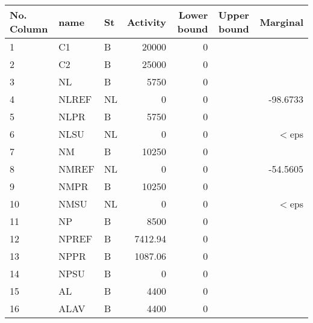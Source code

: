 \documentclass[a4paper,10pt]{article}
\begin{document}
\begin{center}
  \begin{tabular}{| l  l  l  r  r  c  r |}
    \hline
    No. Column &   name &    St &     Activity &       Lower bound &     Upper bound &      Marginal 	\\ \hline
    \hline
      1 &   C1 &             B &            20000 &               0 &                &		\\
      2 &   C2 &             B &            25000 &               0 &                &		\\ \hline                 
      3 &   NL &             B &             5750 &               0 &                &		\\                
      4 &   NLREF &          NL &               0 &               0 &                 &     -98.6733 \\ 
      5 &   NLPR &           B &             5750 &               0 &                &		\\                
      6 &   NLSU &           NL &               0 &               0 &                 &        $<$eps \\  \hline 
      7 &   NM &             B &            10250 &               0 &                &		\\                
      8 &   NMREF &          NL &               0 &               0 &                 &     -54.5605 \\ 
      9 &   NMPR &           B &            10250 &               0 &                &		\\                
     10 &   NMSU &           NL &               0 &               0 &                 &        $<$eps \\ \hline
     11 &   NP &             B &             8500 &               0 &                &		\\                
     12 &   NPREF &          B &          7412.94 &               0 &                &		\\                
     13 &   NPPR &           B &          1087.06 &               0 &                &		\\                
     14 &   NPSU &           B &                0 &               0 &                &		\\ \hline        
     15 &   AL &             B &             4400 &               0 &                &		\\                
     16 &   ALAV &           B &             4400 &               0 &                &		\\  

\end{tabular}
\end{center}
\end{document}
